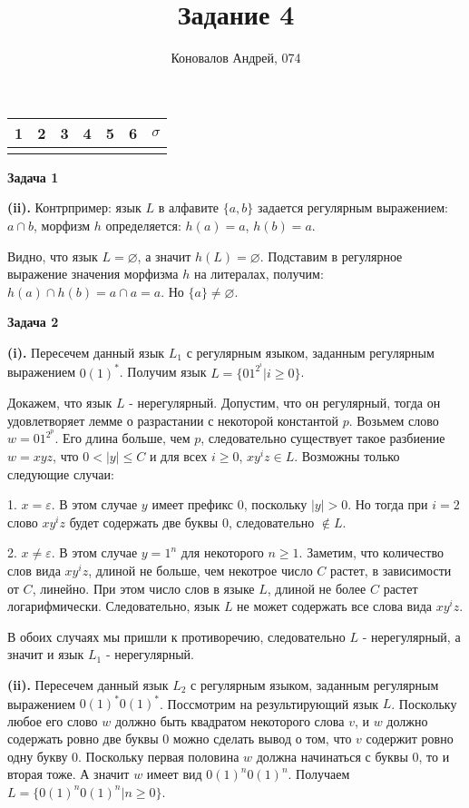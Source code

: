 \documentclass[10pt]{article}
\title{Задание 4}
\author{Коновалов Андрей, 074}
\date{}
\let \eps \varepsilon
\begin{document}
\maketitle

\noindent
\begin{tabularx}{\textwidth}{|C|C|C|C|C|C|C|}
   & 2 & 3 & 4 & 5 & 6 & $\sigma$ \\
  \hline
  &&&&&& \\
  \hline
\end{tabularx}

\bigskip

{\bf Задача 1}

{\bf (ii).}
Контрпример: язык $L$ в алфавите $\{ a, b \}$ задается регулярным выражением: $a \cap b$, морфизм $h$ определяется: $h(a) = a$, $h(b) = a$.

Видно, что язык $L = \varnothing$, а значит $h(L) = \varnothing$. Подставим в регулярное выражение значения морфизма $h$ на литералах, получим: $h(a) \cap h(b) = a \cap a = a$. Но $\{ a \} \neq \varnothing$.

\medskip

{\bf Задача 2}

{\bf (i).}
Пересечем данный язык $L_1$ с регулярным языком, заданным регулярным выражением $0(1)^*$. Получим язык $L = \{ 0 1^{2^i} | i \geq 0 \}$.

Докажем, что язык $L$ - нерегулярный. Допустим, что он регулярный, тогда он удовлетворяет лемме о разрастании с некоторой константой $p$. Возьмем слово $w = 0 1^{2^p}$. Его длина больше, чем $p$, следовательно существует такое разбиение $w = xyz$, что $0 < |y| \leq C$ и для всех $i \geq 0$, $x y^i z \in L$. Возможны только следующие случаи:

1. $x = \eps$. В этом случае $y$ имеет префикс $0$, поскольку $|y| > 0$. Но тогда при $i = 2$ слово $x y^i z$ будет содержать две буквы $0$, следовательно $\notin L$.

2. $x \neq \eps$. В этом случае $y = 1^n$ для некоторого $n \geq 1$. Заметим, что количество слов вида $x y^i z$, длиной не больше, чем некотрое число $C$ растет, в зависимости от $C$, линейно. При этом число слов в языке $L$, длиной не более $C$ растет логарифмически. Следовательно, язык $L$ не может содержать все слова вида $x y^i z$.

В обоих случаях мы пришли к противоречию, следовательно $L$ - нерегулярный, а значит и язык $L_1$ - нерегулярный.

\smallskip

{\bf (ii).} Пересечем данный язык $L_2$ с регулярным языком, заданным регулярным выражением $0 (1)^* 0 (1)^*$. Поссмотрим на результирующий язык $L$. Поскольку любое его слово $w$ должно быть квадратом некоторого слова $v$, и $w$ должно содержать ровно две буквы $0$ можно сделать вывод о том, что $v$ содержит ровно одну букву $0$. Поскольку первая половина $w$ должна начинаться с буквы $0$, то и вторая тоже. А значит $w$ имеет вид $0(1)^n 0 (1)^n$. Получаем $L = \{ 0 (1)^n 0 (1)^n | n \geq 0 \}$.
\end{document}
